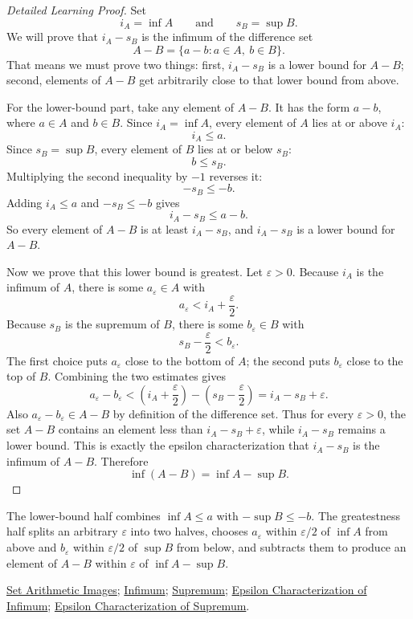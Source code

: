 \begin{proof}[Detailed Learning Proof]
\LRAProofBodyStart
Set
\[
  i_A=\inf A
  \qquad\text{and}\qquad
  s_B=\sup B.
\]
We will prove that $i_A-s_B$ is the infimum of the difference set
\[
  A-B=\{a-b:a\in A,\ b\in B\}.
\]
That means we must prove two things: first, $i_A-s_B$ is a lower bound for
$A-B$; second, elements of $A-B$ get arbitrarily close to that lower bound from
above.

For the lower-bound part, take any element of $A-B$. It has the form $a-b$,
where $a\in A$ and $b\in B$. Since $i_A=\inf A$, every element of $A$ lies at
or above $i_A$:
\[
  i_A\le a.
\]
Since $s_B=\sup B$, every element of $B$ lies at or below $s_B$:
\[
  b\le s_B.
\]
Multiplying the second inequality by $-1$ reverses it:
\[
  -s_B\le -b.
\]
Adding $i_A\le a$ and $-s_B\le -b$ gives
\[
  i_A-s_B\le a-b.
\]
So every element of $A-B$ is at least $i_A-s_B$, and $i_A-s_B$ is a lower
bound for $A-B$.

Now we prove that this lower bound is greatest. Let $\varepsilon>0$. Because
$i_A$ is the infimum of $A$, there is some $a_\varepsilon\in A$ with
\[
  a_\varepsilon<i_A+\frac{\varepsilon}{2}.
\]
Because $s_B$ is the supremum of $B$, there is some $b_\varepsilon\in B$ with
\[
  s_B-\frac{\varepsilon}{2}<b_\varepsilon.
\]
The first choice puts $a_\varepsilon$ close to the bottom of $A$; the second
puts $b_\varepsilon$ close to the top of $B$. Combining the two estimates gives
\[
  a_\varepsilon-b_\varepsilon
  <
  \left(i_A+\frac{\varepsilon}{2}\right)
  -
  \left(s_B-\frac{\varepsilon}{2}\right)
  =
  i_A-s_B+\varepsilon.
\]
Also $a_\varepsilon-b_\varepsilon\in A-B$ by definition of the difference set.
Thus for every $\varepsilon>0$, the set $A-B$ contains an element less than
$i_A-s_B+\varepsilon$, while $i_A-s_B$ remains a lower bound. This is exactly
the epsilon characterization that $i_A-s_B$ is the infimum of $A-B$.
Therefore
\[
  \inf(A-B)=\inf A-\sup B.
\]
\end{proof}

\begin{remark*}
The lower-bound half combines $\inf A\le a$ with $-\sup B\le -b$. The
greatestness half splits an arbitrary $\varepsilon$ into two halves, chooses
$a_\varepsilon$ within $\varepsilon/2$ of $\inf A$ from above and
$b_\varepsilon$ within $\varepsilon/2$ of $\sup B$ from below, and subtracts
them to produce an element of $A-B$ within $\varepsilon$ of
$\inf A-\sup B$.
\end{remark*}

\begin{dependencies}
\hyperref[def:set-arithmetic-images]{Set Arithmetic Images};
\hyperref[def:infimum]{Infimum};
\hyperref[def:supremum]{Supremum};
\hyperref[def:epsilon-characterization-of-infimum]{Epsilon Characterization of Infimum};
\hyperref[def:epsilon-characterization-of-supremum]{Epsilon Characterization of Supremum}.
\end{dependencies}

\clearpage
